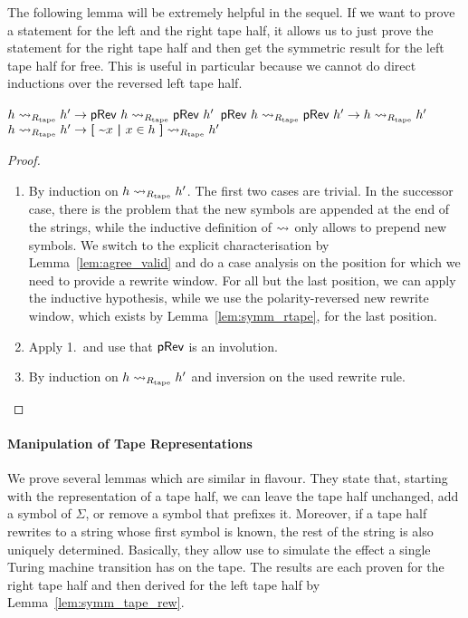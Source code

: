 The following lemma will be extremely helpful in the sequel.
If we want to prove a statement for the left and the right tape half, it allows us to just prove the statement for the right tape half and then get the symmetric result for the left tape half for free. This is useful in particular because we cannot do direct inductions over the reversed left tape half. 

\begin{lemma}\label{lem:symm_tape_rew}\leavevmode
  \begin{enumerate}
     $h \rightsquigarrow_{R_{\text{tape}}} h' \rightarrow \textsf{pRev}~h \rightsquigarrow_{R_{\text{tape}}} \textsf{pRev}~h'$ 
     $\textsf{pRev}~h \rightsquigarrow_{R_{\text{tape}}} \textsf{pRev}~h' \rightarrow h \rightsquigarrow_{R_{\text{tape}}} h'$
     $h \rightsquigarrow_{R_{\text{tape}}} h' \rightarrow \textbf{[}~ \text{\textasciitilde}x ~\textbf{|}~ x \in h ~\textbf{]} \rightsquigarrow_{R_{\text{tape}}} h'$
  \end{enumerate}
\end{lemma}

\begin{proof}\leavevmode
  \begin{enumerate}
    \item By induction on $h \rightsquigarrow_{R_{\text{tape}}} h'$. The first two cases are trivial. 
      In the successor case, there is the problem that the new symbols are appended at the end of the strings, while the inductive definition of $\rightsquigarrow_{}$ only allows to prepend new symbols. We switch to the explicit characterisation by Lemma~\ref{lem:agree_valid} and do a case analysis on the position for which we need to provide a rewrite window. For all but the last position, we can apply the inductive hypothesis, while we use the polarity-reversed new rewrite window, which exists by Lemma~\ref{lem:symm_rtape}, for the last position.
    \item Apply 1.\ and use that $\textsf{pRev}$ is an involution.
    \item By induction on $h \rightsquigarrow_{R_{\text{tape}}} h'$ and inversion on the used rewrite rule.
  \end{enumerate}
\end{proof}


\paragraph{Manipulation of Tape Representations}

We prove several lemmas which are similar in flavour. They state that, starting with the representation of a tape half, we can leave the tape half unchanged, add a symbol of $\Sigma$, or remove a symbol that prefixes it. Moreover, if a tape half rewrites to a string whose first symbol is known, the rest of the string is also uniquely determined. 
Basically, they allow use to simulate the effect a single Turing machine transition has on the tape.
The results are each proven for the right tape half and then derived for the left tape half by Lemma~\ref{lem:symm_tape_rew}. 

